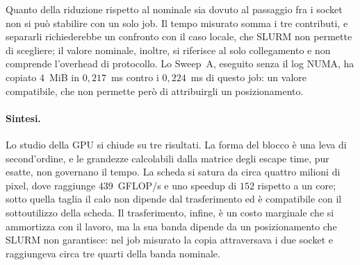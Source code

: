 Quanto della riduzione rispetto al nominale sia dovuto al passaggio fra i socket
non si può stabilire con un solo job. Il tempo misurato somma i tre contributi, e
separarli richiederebbe un confronto con il caso locale, che SLURM non permette di
scegliere; il valore nominale, inoltre, si riferisce al solo collegamento e non
comprende l'overhead di protocollo. Lo Sweep~A, eseguito senza il log NUMA, ha
copiato $4$~MiB in $0{,}217$~ms contro i $0{,}224$~ms di questo job: un valore
compatibile, che non permette però di attribuirgli un posizionamento.

\paragraph{Sintesi.}
Lo studio della GPU si chiude su tre risultati. La forma del blocco è una leva di
second'ordine, e le grandezze calcolabili dalla matrice degli escape time, pur
esatte, non governano il tempo. La scheda si satura da circa quattro milioni di
pixel, dove raggiunge $439$~GFLOP/s e uno speedup di $152$ rispetto a un core;
sotto quella taglia il calo non dipende dal trasferimento ed è compatibile con il
sottoutilizzo della scheda. Il trasferimento, infine, è un costo marginale che si ammortizza
con il lavoro, ma la sua banda dipende da un posizionamento che SLURM non
garantisce: nel job misurato la copia attraversava i due socket e raggiungeva
circa tre quarti della banda nominale.
